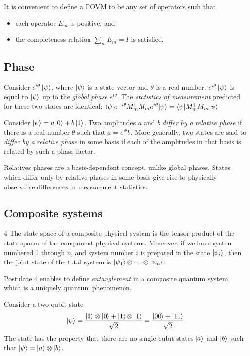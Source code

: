 It is convenient to define a POVM to be any set of operators such that

\begin{itemize}
    \item each operator $E_m$ is positive, and
    \item the completeness relation $\sum_m E_m = I$ is satisfied.
\end{itemize}

\subsection{Phase}
Consider $e^{i\theta}\ket{\psi}$, where $\ket{\psi}$ is a state vector and $\theta$ is a real number.
$e^{i\theta}\ket{\psi}$ is equal to $\ket{\psi}$ up to the \emph{global phase} $e^{i\theta}$.
The \emph{statistics of measurement} predicted for these two states are identical:
$\braket{\psi|e^{-i\theta}M_m^\dagger M_m e^{i\theta}|\psi} = \braket{\psi|M_m^\dagger M_m|\psi}$

Consider $\ket{\psi} = a\ket{0} + b\ket{1}$.
Two amplitudes $a$ and $b$ \emph{differ by a relative phase} if there is a real number $\theta$ such that $a = e^{i\theta}b$.
More generally,
two states are said to \emph{differ by a relative phase} in some basis if each of the amplitudes in that basis is related by such a phase factor.

Relatives phases are a basis-dependent concept, unlike global phases.
States which differ only by relative phases in some basis give rise to physically observable differences in measurement statistics.

\subsection{Composite systems}
\begin{postulate}{4}
    The state space of a composite physical system is the tensor product of the state spaces of the component physical systems.
    Moreover, if we have system numbered \num{1}  through $n$, and system number $i$ is prepared in the state $\ket{\psi_i}$,
    then the joint state of the total system is $\ket{\psi_1} \otimes \cdots \otimes \ket{\psi_n}$.
\end{postulate}

Postulate 4 enables to define \emph{entanglement} in a composite quantum system,
which is a uniquely quantum phenomenon.

Consider a two-qubit state
\[
    \ket{\psi} = \frac{\ket{0}\otimes\ket{0} + \ket{1}\otimes\ket{1}}{\sqrt{2}} = \frac{\ket{00} + \ket{11}}{\sqrt{2}}.
\]
The state has the property that there are no single-qubit states $\ket{a}$ and $\ket{b}$ such that $\ket{\psi} = \ket{a}\otimes\ket{b}$.

